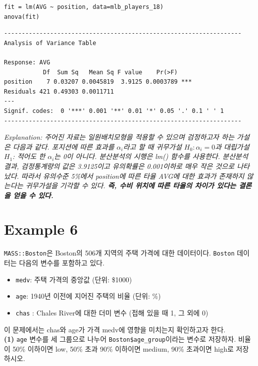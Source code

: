 \documentclass{article}
\begin{document}
\begin{lstlisting}[style={r-style}]
fit = lm(AVG ~ position, data=mlb_players_18)
anova(fit)
\end{lstlisting}
\begin{lstlisting}[style={out-style}]
-------------------------------------------------------------------    
Analysis of Variance Table

Response: AVG
           Df  Sum Sq   Mean Sq F value    Pr(>F)    
position    7 0.03207 0.0045819  3.9125 0.0003789 ***
Residuals 421 0.49303 0.0011711  
---
Signif. codes:  0 '***' 0.001 '**' 0.01 '*' 0.05 '.' 0.1 ' ' 1
-------------------------------------------------------------------
\end{lstlisting}
\emph{Explanation: 주어진 자료는 일원배치모형을 적용할 수 있으며 검정하고자 하는 가설은 다음과 같다. 포지션에 따른 효과를 $\alpha_i$라고 할 때 귀무가설 $H_0: \alpha_i=0$과 대립가설 $H_1$: 적어도 한 $\alpha_i$는 0이 아니다. 분산분석의 시행은 lm() 함수를 사용한다. 분산분석 결과, 검정통계량의 값은 3.9125이고 유의확률은 0.001이하로 매우 작은 것으로 나타났다. 따라서 유의수준 5\%에서 position에 따른 타율 AVG에 대한 효과가 존재하지 않는다는 귀무가설을 기각할 수 있다. \textbf{즉, 수비 위치에 따른 타율의 차이가 있다는 결론을 얻을 수 있다.}} \\

\section*{Example 6}
\texttt{MASS::Boston}은 Boston의 506개 지역의 주택 가격에 대한 데이터이다. \texttt{Boston} 데이터는 다음의 변수를 포함하고 있다. 

\begin{itemize}
  \setlength\itemsep{-0.4em}
    \item \texttt{medv}: 주택 가격의 중앙값 (단위: \$1000)
    \item \texttt{age}: 1940년 이전에 지어진 주택의 비율 (단위: \%)
    \item \texttt{chas} : Chales River에 대한 더미 변수 (접해 있을 때 1, 그 외에 0)
\end{itemize}
이 문제에서는 chas와 age가 가격 medv에 영향을 미치는지 확인하고자 한다.\\

\textbf{(1)} \texttt{age} 변수를 세 그룹으로 나누어 \texttt{Boston\$age\_group}이라는 변수로 저장하자. 비율이 50\%
이하이면 low, 50\% 초과 90\% 이하이면 medium, 90\% 초과이면 high로 저장하시오.
\end{document}
